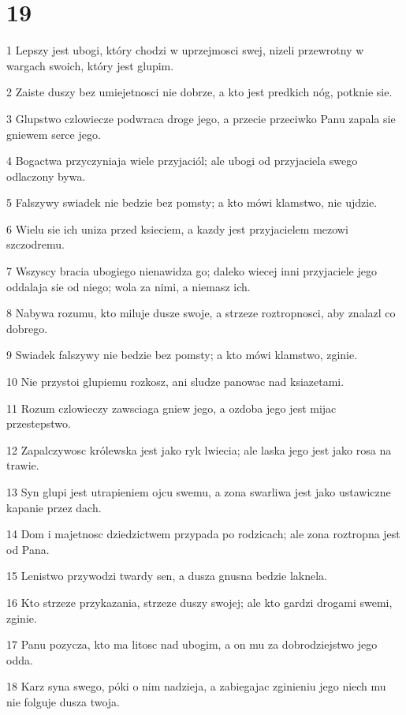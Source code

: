 \chapter{19}

\par 1 Lepszy jest ubogi, który chodzi w uprzejmosci swej, nizeli przewrotny w wargach swoich, który jest glupim.
\par 2 Zaiste duszy bez umiejetnosci nie dobrze, a kto jest predkich nóg, potknie sie.
\par 3 Glupstwo czlowiecze podwraca droge jego, a przecie przeciwko Panu zapala sie gniewem serce jego.
\par 4 Bogactwa przyczyniaja wiele przyjaciól; ale ubogi od przyjaciela swego odlaczony bywa.
\par 5 Falszywy swiadek nie bedzie bez pomsty; a kto mówi klamstwo, nie ujdzie.
\par 6 Wielu sie ich uniza przed ksieciem, a kazdy jest przyjacielem mezowi szczodremu.
\par 7 Wszyscy bracia ubogiego nienawidza go; daleko wiecej inni przyjaciele jego oddalaja sie od niego; wola za nimi, a niemasz ich.
\par 8 Nabywa rozumu, kto miluje dusze swoje, a strzeze roztropnosci, aby znalazl co dobrego.
\par 9 Swiadek falszywy nie bedzie bez pomsty; a kto mówi klamstwo, zginie.
\par 10 Nie przystoi glupiemu rozkosz, ani sludze panowac nad ksiazetami.
\par 11 Rozum czlowieczy zawsciaga gniew jego, a ozdoba jego jest mijac przestepstwo.
\par 12 Zapalczywosc królewska jest jako ryk lwiecia; ale laska jego jest jako rosa na trawie.
\par 13 Syn glupi jest utrapieniem ojcu swemu, a zona swarliwa jest jako ustawiczne kapanie przez dach.
\par 14 Dom i majetnosc dziedzictwem przypada po rodzicach; ale zona roztropna jest od Pana.
\par 15 Lenistwo przywodzi twardy sen, a dusza gnusna bedzie laknela.
\par 16 Kto strzeze przykazania, strzeze duszy swojej; ale kto gardzi drogami swemi, zginie.
\par 17 Panu pozycza, kto ma litosc nad ubogim, a on mu za dobrodziejstwo jego odda.
\par 18 Karz syna swego, póki o nim nadzieja, a zabiegajac zginieniu jego niech mu nie folguje dusza twoja.
